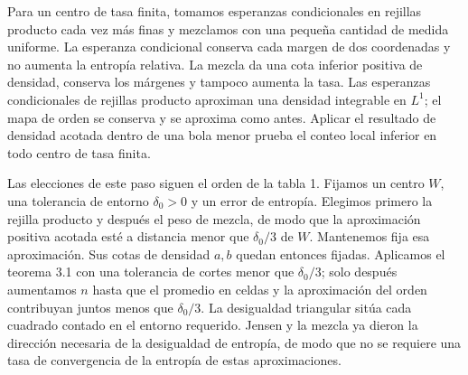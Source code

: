 \documentclass[spanish,11pt,a4paper]{article}
\begin{document}
Para un centro de tasa finita, tomamos esperanzas condicionales en rejillas producto cada vez más finas y mezclamos con una pequeña cantidad de medida uniforme. La esperanza condicional conserva cada margen de dos coordenadas y no aumenta la entropía relativa. La mezcla da una cota inferior positiva de densidad, conserva los márgenes y tampoco aumenta la tasa. Las esperanzas condicionales de rejillas producto aproximan una densidad integrable en \(L^1\); el mapa de orden se conserva y se aproxima como antes. Aplicar el resultado de densidad acotada dentro de una bola menor prueba el conteo local inferior en todo centro de tasa finita.

Las elecciones de este paso siguen el orden de la tabla 1. Fijamos un centro \(W\), una tolerancia de entorno \(\delta_0>0\) y un error de entropía. Elegimos primero la rejilla producto y después el peso de mezcla, de modo que la aproximación positiva acotada esté a distancia menor que \(\delta_0/3\) de \(W\). Mantenemos fija esa aproximación. Sus cotas de densidad \(a,b\) quedan entonces fijadas. Aplicamos el teorema 3.1 con una tolerancia de cortes menor que \(\delta_0/3\); solo después aumentamos \(n\) hasta que el promedio en celdas y la aproximación del orden contribuyan juntos menos que \(\delta_0/3\). La desigualdad triangular sitúa cada cuadrado contado en el entorno requerido. Jensen y la mezcla ya dieron la dirección necesaria de la desigualdad de entropía, de modo que no se requiere una tasa de convergencia de la entropía de estas aproximaciones.
\end{document}
